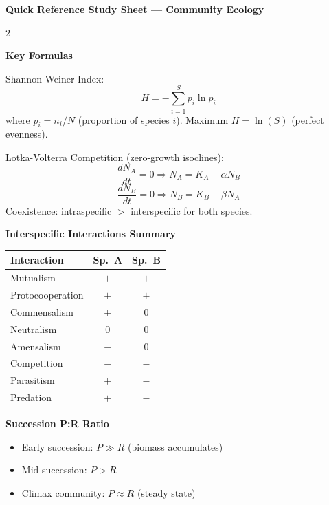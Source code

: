 \documentclass[11pt]{article}
\begin{document}
\begin{tcolorbox}[enhanced,colback=olive!8,colframe=olive!70!black,
  arc=6pt,boxrule=1.4pt,halign=center,top=0.4cm,bottom=0.3cm]
  {\large\bfseries\color{sectioncolor} Quick Reference Study Sheet --- Community Ecology}
\end{tcolorbox}

\vspace{0.3cm}

\begin{multicols}{2}

\textbf{\color{sectioncolor}Key Formulas}

Shannon-Weiner Index:
\[ H = -\sum_{i=1}^{S} p_i \ln p_i \]
where $p_i = n_i / N$ (proportion of species $i$).
Maximum $H = \ln(S)$ (perfect evenness).

\vspace{0.2cm}

Lotka-Volterra Competition (zero-growth isoclines):
\[ \frac{dN_A}{dt}=0 \Rightarrow N_A = K_A - \alpha N_B \]
\[ \frac{dN_B}{dt}=0 \Rightarrow N_B = K_B - \beta N_A \]
Coexistence: intraspecific $>$ interspecific for both species.

\vspace{0.3cm}

\textbf{\color{sectioncolor}Interspecific Interactions Summary}

\begin{tabular}{lcc}
\toprule
\textbf{Interaction} & \textbf{Sp.\ A} & \textbf{Sp.\ B} \\
\midrule
Mutualism & $+$ & $+$ \\
Protocooperation & $+$ & $+$ \\
Commensalism & $+$ & $0$ \\
Neutralism & $0$ & $0$ \\
Amensalism & $-$ & $0$ \\
Competition & $-$ & $-$ \\
Parasitism & $+$ & $-$ \\
Predation & $+$ & $-$ \\
\bottomrule
\end{tabular}

\vspace{0.3cm}

\textbf{\color{sectioncolor}Succession P:R Ratio}

\begin{itemize}[noitemsep,leftmargin=*]
  \item Early succession: $P \gg R$ (biomass accumulates)
  \item Mid succession: $P > R$
  \item Climax community: $P \approx R$ (steady state)
\end{itemize}


\end{multicols}
\end{document}
